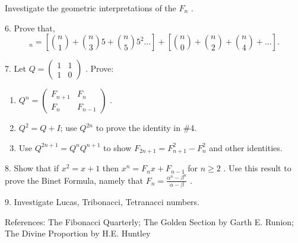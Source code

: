 \documentclass[10pt,]{book}
\theoremstyle{plain}
\theoremstyle{definition}
\theoremstyle{definition}
\theoremstyle{definition}
\numberwithin{equation}{chapter}
\newcommand{\amp}{&}
\begin{document}
\begin{exerciselist}
Investigate the geometric interpretations of the \(F_{n}\) .%
\par\smallskip
\item[6.]\hypertarget{exercise-23}{}\hypertarget{p-1689}{}%
Prove that,%
\begin{equation*}
_{n} = \left\lbrack \binom{n}{1}  + \binom{n}{3} 5 + \binom{n}{5} 5^{2}\ldots \right\rbrack + \left\lbrack \binom{n}{0}  + \binom{n}{2}  + \binom{n}{4}  + \ldots \right\rbrack.
\end{equation*}
%
\par\smallskip
\item[7.]\hypertarget{exercise-24}{}\hypertarget{p-1690}{}%
Let \(Q =\begin{pmatrix}1 \amp 1 \\ 1 \amp 0\end{pmatrix}\) . Prove: \leavevmode%
\begin{enumerate}[label=(\alph*)]
\item\hypertarget{li-92}{}\hypertarget{p-1691}{}%
\(Q^{n} = \begin{pmatrix} F_{n + 1} \amp F_{n}\\ F_{n} \amp F_{n - 1} \end{pmatrix}\) .%
\item\hypertarget{li-93}{}\hypertarget{p-1692}{}%
\(Q^{2} = Q + I\); use \(Q^{2n}\) to prove the identity in \#4.%
\item\hypertarget{li-94}{}\hypertarget{p-1693}{}%
Use \(Q^{2n + 1} = Q^{n}Q^{n + 1}\) to show \(F_{2n + 1} = F_{n + 1}^{2} - F_{n}^{2}\) and other identities.%
\end{enumerate}
%
\par\smallskip
\item[8.]\hypertarget{exercise-25}{}\hypertarget{p-1694}{}%
Show that if \(x^{2} = x + 1\) then \(x^{n} = F_{n}x + F_{n - 1}\) for \(n \geq 2\) . Use this result to prove the Binet Formula, namely that \(F_{n} = \frac{\alpha^{n} - \beta^{n}}{\alpha - \beta}\) .%
\par\smallskip
\item[9.]\hypertarget{exercise-26}{}\hypertarget{p-1695}{}%
Investigate Lucas, Tribonacci, Tetranacci numbers.%
\par\smallskip
\end{exerciselist}
\bigbreak
\hypertarget{p-1696}{}%
References: The Fibonacci Quarterly; The Golden Section by Garth E. Runion; The Divine Proportion by H.E. Huntley%
\typeout{************************************************}
\typeout{************************************************}
\end{document}
